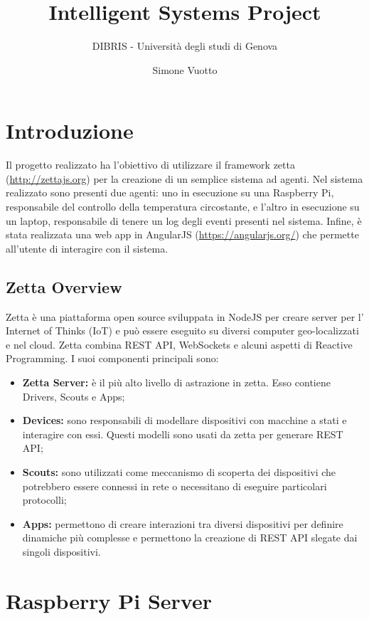 \documentclass[]{scrartcl}
\title{Intelligent Systems Project}
\subtitle{DIBRIS - Università degli studi di Genova}
\author{Simone Vuotto}
\begin{document}
\maketitle

\section{Introduzione} 

Il progetto realizzato ha l'obiettivo di utilizzare il framework zetta (\url{http://zettajs.org}) per la creazione di un semplice sistema ad agenti. Nel sistema realizzato sono presenti due agenti: uno in esecuzione su una Raspberry Pi, responsabile del controllo della temperatura circostante, e l'altro in esecuzione su un laptop, responsabile di tenere un log degli eventi presenti nel sistema. Infine, è stata realizzata una web app in AngularJS (\url{https://angularjs.org/}) che permette all'utente di interagire con il sistema.

\subsection{Zetta Overview}

Zetta è una piattaforma open source sviluppata in NodeJS per creare server per l' Internet of Thinks (IoT) e può essere eseguito su diversi computer geo-localizzati e nel cloud. Zetta combina REST API, WebSockets e alcuni aspetti di Reactive Programming. I suoi componenti principali sono:
\begin{itemize}
\item \textbf{Zetta Server:} è il più alto livello di astrazione in zetta. Esso contiene Drivers, Scouts e Apps;
\item \textbf{Devices:} sono responsabili di modellare dispositivi con macchine a stati e interagire con essi. Questi modelli sono usati da zetta per generare REST API;
\item \textbf{Scouts:} sono utilizzati come meccanismo di scoperta dei dispositivi che potrebbero essere connessi in rete o necessitano di eseguire particolari protocolli;
\item \textbf{Apps:} permettono di creare interazioni tra diversi dispositivi per definire dinamiche più complesse e permettono la creazione di REST API slegate dai singoli dispositivi.

\end{itemize}

\newpage

\section{Raspberry Pi Server}
\end{document}
